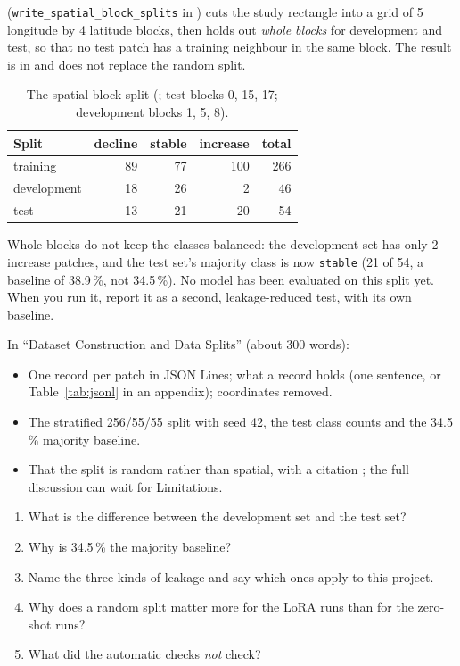  (\texttt{write\_spatial\_block\_splits} in ) cuts the study rectangle into a grid of 5 longitude by 4 latitude blocks, then holds out \emph{whole blocks} for development and test, so that no test patch has a training neighbour in the same block. The result is in  and does not replace the random split.

\begin{table}[H]
\centering
\caption{The spatial block split (; test blocks 0, 15, 17; development blocks 1, 5, 8).}
\label{tab:spatialsplit}
\begin{tabular}{lrrrr}
\toprule
Split & decline & stable & increase & total \\
\midrule
training & 89 & 77 & 100 & 266 \\
development & 18 & 26 & 2 & 46 \\
test & 13 & 21 & 20 & 54 \\
\bottomrule
\end{tabular}
\end{table}

\begin{watchout}
Whole blocks do not keep the classes balanced: the development set has only 2 increase patches, and the test set's majority class is now \texttt{stable} (21 of 54, a baseline of 38.9\,\%, not 34.5\,\%). No model has been evaluated on this split yet. When you run it, report it as a second, leakage-reduced test, with its own baseline.
\end{watchout}

\begin{foryourreport}
In ``Dataset Construction and Data Splits'' (about 300 words):
\begin{itemize}
  \item One record per patch in JSON Lines; what a record holds (one sentence, or Table~\ref{tab:jsonl} in an appendix); coordinates removed.
  \item The stratified 256/55/55 split with seed 42, the test class counts and the 34.5\,\% majority baseline.
  \item That the split is random rather than spatial, with a citation \citep{roberts2017,ploton2020}; the full discussion can wait for Limitations.
\end{itemize}
\end{foryourreport}

\begin{selfcheck}
\begin{enumerate}
  \item What is the difference between the development set and the test set?
  \item Why is 34.5\,\% the majority baseline?
  \item Name the three kinds of leakage and say which ones apply to this project.
  \item Why does a random split matter more for the LoRA runs than for the zero-shot runs?
  \item What did the automatic checks \emph{not} check?
\end{enumerate}
\end{selfcheck}
